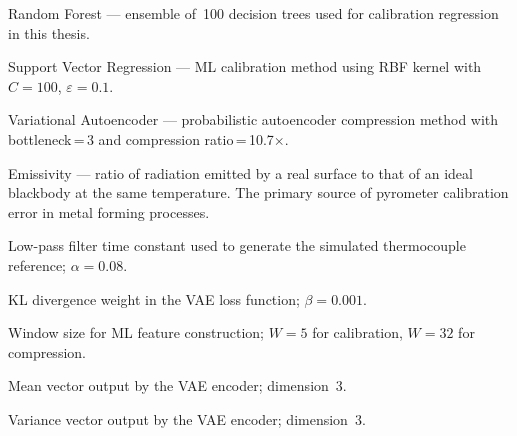 \begin{description}[leftmargin=2em, itemsep=4pt]
\item[RF] Random Forest --- ensemble of~100 decision trees used for calibration regression in this thesis.

\item[SVR] Support Vector Regression --- ML calibration method using RBF kernel with $C=100$, $\varepsilon=0.1$.

\item[VAE] Variational Autoencoder --- probabilistic autoencoder compression method with bottleneck\,=\,3 and compression ratio\,=\,10.7$\times$.

\item[$\varepsilon$] Emissivity --- ratio of radiation emitted by a real surface to that of an ideal blackbody at the same temperature. The primary source of pyrometer calibration error in metal forming processes.

\item[$\alpha$] Low-pass filter time constant used to generate the simulated thermocouple reference; $\alpha = 0.08$.

\item[$\beta$] KL divergence weight in the VAE loss function; $\beta = 0.001$.

\item[$W$] Window size for ML feature construction; $W = 5$ for calibration, $W = 32$ for compression.

\item[$\mu$] Mean vector output by the VAE encoder; dimension~3.

\item[$\sigma^2$] Variance vector output by the VAE encoder; dimension~3.
\end{description}

\clearpage

